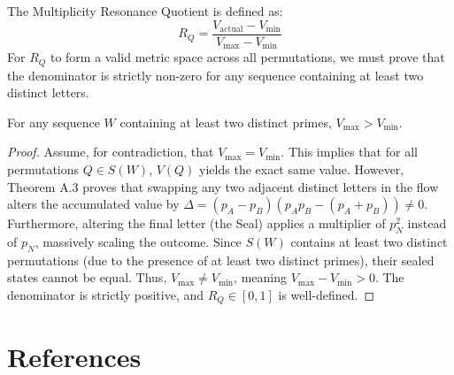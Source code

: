 \documentclass[11pt]{article}
\begin{document}
The Multiplicity Resonance Quotient is defined as:
\[
R_Q = \frac{V_{\text{actual}} - V_{\min}}{V_{\max} - V_{\min}}
\]
For $R_Q$ to form a valid metric space across all permutations, we must prove that the denominator is strictly non-zero for any sequence containing at least two distinct letters.

\begin{lemma}
For any sequence $W$ containing at least two distinct primes, $V_{\max} > V_{\min}$. 
\end{lemma}

\begin{proof}
Assume, for contradiction, that $V_{\max} = V_{\min}$. This implies that for all permutations $Q \in S(W)$, $V(Q)$ yields the exact same value. 
However, Theorem A.3 proves that swapping any two adjacent distinct letters in the flow alters the accumulated value by $\Delta = (p_A - p_B)(p_A p_B - (p_A + p_B)) \neq 0$. 
Furthermore, altering the final letter (the Seal) applies a multiplier of $p_N^2$ instead of $p_N$, massively scaling the outcome. Since $S(W)$ contains at least two distinct permutations (due to the presence of at least two distinct primes), their sealed states cannot be equal.
Thus, $V_{\max} \neq V_{\min}$, meaning $V_{\max} - V_{\min} > 0$. The denominator is strictly positive, and $R_Q \in [0,1]$ is well-defined.
\end{proof}

\section*{References}
\end{document}

